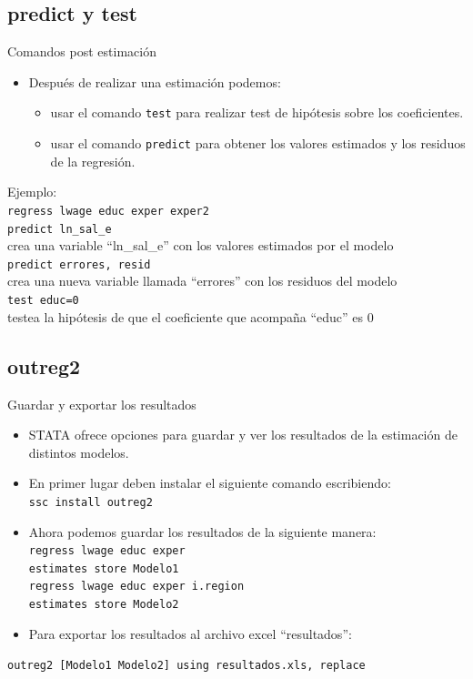 \documentclass{beamer}
\begin{document}
\subsection{predict y test}
\begin{frame}{Comandos post estimación}
\begin{itemize}
\item Después de realizar una estimación  podemos:
\begin{itemize}
\item usar el comando \texttt{test} para realizar test de hipótesis sobre los coeficientes. 
\item usar el comando \texttt{predict} para obtener los valores estimados y los residuos de la regresión.
\end{itemize}
\end{itemize}
{\footnotesize Ejemplo:}\\
{\footnotesize \texttt{regress  lwage educ exper exper2}}\\
{\footnotesize \texttt{predict ln\_sal\_e}}\\
{\footnotesize *crea una variable ``ln\_sal\_e'' con los valores estimados por el modelo}\\
{\footnotesize \texttt{predict errores, resid}}\\
{\footnotesize *crea una nueva variable llamada ``errores'' con los residuos del modelo}\\
{\footnotesize \texttt{test educ=0}}\\
{\footnotesize * testea la hipótesis de que el coeficiente que acompaña ``educ'' es 0}\\\medskip
\end{frame}
\subsection{outreg2}
\begin{frame}{Guardar y exportar los resultados}
\begin{itemize}
\item STATA ofrece opciones para guardar y ver los resultados de la estimación de distintos modelos.
\item En primer lugar deben instalar el siguiente comando escribiendo: \\
{\footnotesize \texttt{ssc install outreg2}}
\item Ahora podemos guardar los resultados de la siguiente manera: \\
{\footnotesize \texttt{regress lwage educ exper}}\\
{\footnotesize \texttt{estimates store Modelo1}}\\
{\footnotesize \texttt{regress lwage educ exper i.region}}\\
{\footnotesize \texttt{estimates store Modelo2}}
\item Para exportar los resultados al archivo excel ``resultados'':
\end{itemize}
{\footnotesize \texttt{outreg2 [Modelo1 Modelo2] using resultados.xls, replace}}

\end{frame}
\end{document}
